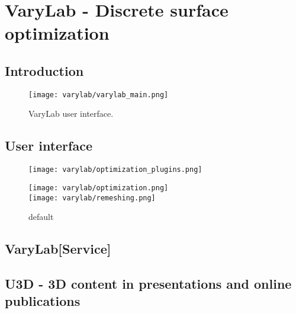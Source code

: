 \documentclass[Thesis.tex]{subfiles}
\begin{document}
\chapter{{\sc VaryLab} - Discrete surface optimization}
\label{chp:varylab}

\section{Introduction}

\begin{figure}
\begin{center}
\texttt{[image: varylab/varylab\_main.png]}
\caption{{\sc VaryLab} user interface.}
\label{fig:varylab_main_ui}
\end{center}
\end{figure}

\section{User interface}

\begin{figure}
\begin{center}
\texttt{[image: varylab/optimization\_plugins.png]}\hfill
\begin{minipage}[b]{0.49\linewidth}
\texttt{[image: varylab/optimization.png]}\\
\vskip 0.1cm
\texttt{[image: varylab/remeshing.png]}\\
\end{minipage}
\caption{default}
\label{default}
\end{center}
\end{figure}



\section{{\sc VaryLab[Service]}}

\section{{\sc U3D} - 3D content in presentations and online publications}
\label{sec:u3d}

\subfilebibliography
\end{document}
